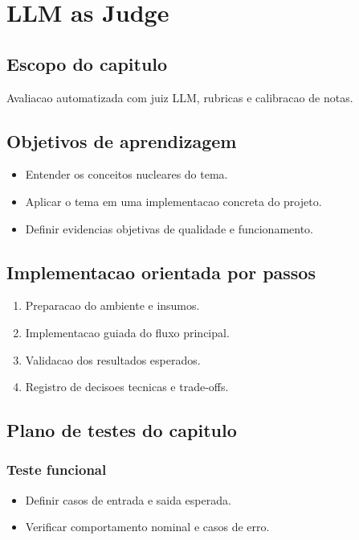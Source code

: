 \chapter{LLM as Judge}
\label{chap:llm_as_judge}

\section{Escopo do capitulo}
Avaliacao automatizada com juiz LLM, rubricas e calibracao de notas.

\section{Objetivos de aprendizagem}
\begin{itemize}[leftmargin=*]
  \item Entender os conceitos nucleares do tema.
  \item Aplicar o tema em uma implementacao concreta do projeto.
  \item Definir evidencias objetivas de qualidade e funcionamento.
\end{itemize}

\section{Implementacao orientada por passos}
\begin{enumerate}[leftmargin=*]
  \item Preparacao do ambiente e insumos.
  \item Implementacao guiada do fluxo principal.
  \item Validacao dos resultados esperados.
  \item Registro de decisoes tecnicas e trade-offs.
\end{enumerate}

\section{Plano de testes do capitulo}
\subsection{Teste funcional}
\begin{itemize}[leftmargin=*]
  \item Definir casos de entrada e saida esperada.
  \item Verificar comportamento nominal e casos de erro.
\end{itemize}

